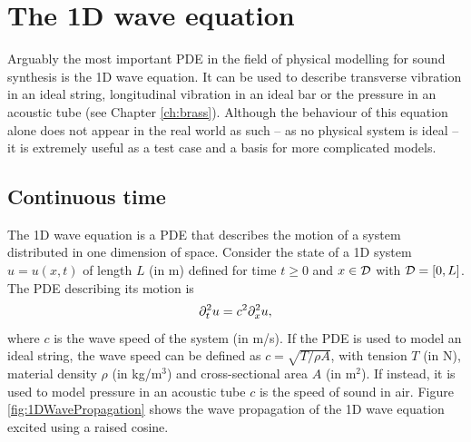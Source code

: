 
    
    
    

\section{%
The 1D wave equation}\label{sec:1DWave}
Arguably the most important PDE in the field of physical modelling for sound synthesis is the 1D wave equation. It can be used to describe transverse vibration in an ideal string, longitudinal vibration in an ideal bar or the pressure in an acoustic tube (see Chapter \ref{ch:brass}). Although the behaviour of this equation alone does not appear in the real world as such -- as no physical system is ideal -- it is extremely useful as a test case and a basis for more complicated models. %

\subsection{Continuous time}\label{sec:1DwaveContTime}
The 1D wave equation is a PDE that describes the motion of a system distributed in one dimension of space. Consider the state of a 1D system $u=u(x,t)$ of length $L$ (in m) defined for time $t\geq 0$ and $x\in \mathcal{D}$ with $\mathcal{D} = [0, L]$. The PDE describing its motion is
\begin{equation}\label{eq:1DwavePDE}
    \partial_t^2 u = c^2 \partial_x^2 u,
\end{equation}
where $c$ is the wave speed of the system (in m/s). If the PDE is used to model an ideal string, the wave speed can be defined as $c = \sqrt{T / \rho A}$, with tension $T$ (in N), material density $\rho$ (in kg/m$^3$) and cross-sectional area $A$ (in m$^2$). If instead, it is used to model pressure in an acoustic tube $c$ is the speed of sound in air. Figure \ref{fig:1DWavePropagation} shows the wave propagation of the 1D wave equation excited using a raised cosine. 


